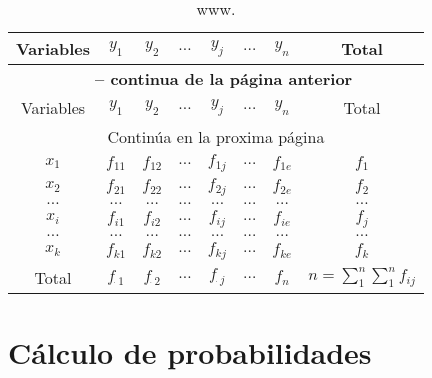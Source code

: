 \documentclass[a4paper]{report}
\begin{document}
												\begin{longtable}{|c|cccccc|c|}
													\caption{www.}
													\label{tab:w}\\
													\hline
													Variables&$y_1$&$y_2$&$\ldots$&$y_{j}$&$\ldots$&$y_n$&Total\\
													\hline
													\endfirsthead
													\multicolumn{8}{c}{{\bfseries \tablename\ \thetable{} -- continua de la página anterior}}\\
													\hline
													Variables&$y_1$&$y_2$&$\ldots$&$y_{j}$&$\ldots$&$y_n$&Total\\
													\hline
													\endhead
													\hline
													\multicolumn{8}{c}{{Continúa en la proxima página}} \\
													\hline
													\endfoot
													\hline
													\endlastfoot
													$x_1$&$f_{11}$&$f_{12}$    &$\ldots$&$f_{1j}$&$\ldots$&$f_{1e}$&$f_1$\\
													$x_2$&$f_{21}$&$f_{22}$    &$\ldots$&$f_{2j}$&$\ldots$&$f_{2e}$&$f_2$\\
													$\ldots$&$\ldots$&$\ldots$ &$\ldots$&$\ldots$&$\ldots$&$\ldots$&$\ldots$\\
													$x_i$&$f_{i1}$&$f_{i2}$    &$\ldots$&$f_{ij}$&$\ldots$&$f_{ie}$&$f_j$\\
													$\ldots$&$\ldots$&$\ldots$ &$\ldots$&$\ldots$&$\ldots$&$\ldots$&$\ldots$\\
													$x_k$&$f_{k1}$&$f_{k2}$    &$\ldots$&$f_{kj}$&$\ldots$&$f_{ke}$&$f_k$\\
													\hline
													Total&$f_{\dot \; 1}$&$f_{\dot \; 2}$   &$\ldots$&$f_{\dot \; j}$&$\ldots$&$f_n$  &$n=\sum_1^{n}\sum_1^{n}f_{ij}$\\
												\end{longtable}




												\part{Cálculo de probabilidades}
\end{document}
